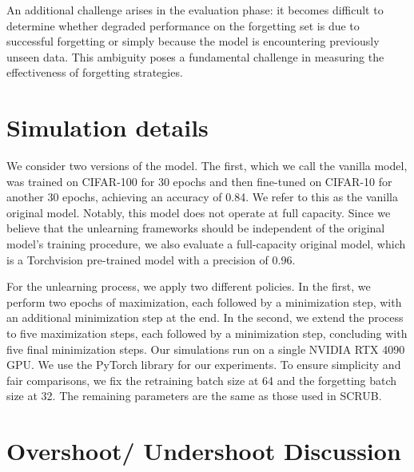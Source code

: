 \documentclass{article} %
\begin{document}
An additional challenge arises in the evaluation phase: it becomes difficult to determine whether degraded performance on the forgetting set is due to successful forgetting or simply because the model is encountering previously unseen data. This ambiguity poses a fundamental challenge in measuring the effectiveness of forgetting strategies.

\section{Simulation details} \label{detail:epx}
We consider two versions of the model. The first, which we call the vanilla model, was trained on CIFAR-100 for 30 epochs and then fine-tuned on CIFAR-10 for another 30 epochs, achieving an accuracy of 0.84. We refer to this as the vanilla original model. Notably, this model does not operate at full capacity.
Since we believe that the unlearning frameworks should be independent of the original model’s training procedure, we also evaluate a full-capacity original model, which is a Torchvision pre-trained model with a precision of 0.96.

For the unlearning process, we apply two different policies. In the first, we perform two epochs of maximization, each followed by a minimization step, with an additional minimization step at the end. In the second, we extend the process to five maximization steps, each followed by a minimization step, concluding with five final minimization steps.
Our simulations run on a single NVIDIA RTX 4090 GPU. We use the PyTorch library for our experiments. To ensure simplicity and fair comparisons, we fix the retraining batch size at 64 and the forgetting batch size at 32. The remaining parameters are the same as those used in SCRUB.
\section{Overshoot/ Undershoot Discussion} \label{appendix:Over/Under}
\end{document}
